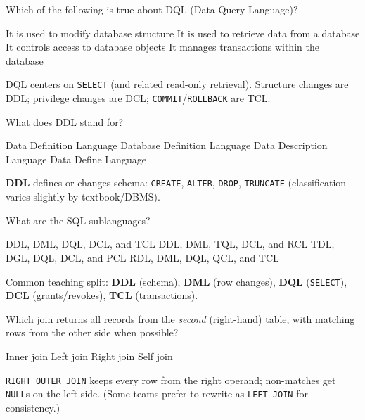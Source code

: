 \question[4]
Which of the following is true about DQL (Data Query Language)?
\begin{choices}
  \choice It is used to modify database structure
  \CorrectChoice It is used to retrieve data from a database
  \choice It controls access to database objects
  \choice It manages transactions within the database
\end{choices}
\begin{solution}
  DQL centers on \texttt{SELECT} (and related read-only retrieval). Structure changes are DDL; privilege changes are DCL; \texttt{COMMIT}/\texttt{ROLLBACK} are TCL.
\end{solution}

\question[4]
What does DDL stand for?
\begin{choices}
  \CorrectChoice Data Definition Language
  \choice Database Definition Language
  \choice Data Description Language
  \choice Data Define Language
\end{choices}
\begin{solution}
  \textbf{DDL} defines or changes schema: \texttt{CREATE}, \texttt{ALTER}, \texttt{DROP}, \texttt{TRUNCATE} (classification varies slightly by textbook/DBMS).
\end{solution}

\question[4]
What are the SQL sublanguages?
\begin{choices}
  \CorrectChoice DDL, DML, DQL, DCL, and TCL
  \choice DDL, DML, TQL, DCL, and RCL
  \choice TDL, DGL, DQL, DCL, and PCL
  \choice RDL, DML, DQL, QCL, and TCL
\end{choices}
\begin{solution}
  Common teaching split: \textbf{DDL} (schema), \textbf{DML} (row changes), \textbf{DQL} (\texttt{SELECT}), \textbf{DCL} (grants/revokes), \textbf{TCL} (transactions).
\end{solution}

\question[4]
Which join returns all records from the \emph{second} (right-hand) table, with matching rows from the other side when possible?
\begin{choices}
  \choice Inner join
  \choice Left join
  \CorrectChoice Right join
  \choice Self join
\end{choices}
\begin{solution}
  \texttt{RIGHT OUTER JOIN} keeps every row from the right operand; non-matches get \texttt{NULL}s on the left side. (Some teams prefer to rewrite as \texttt{LEFT JOIN} for consistency.)
\end{solution}

